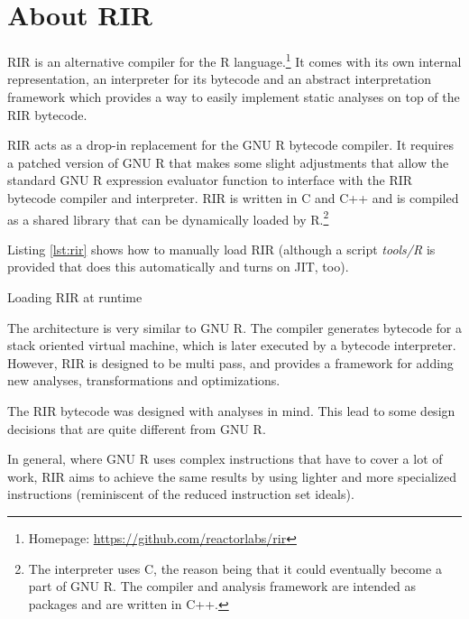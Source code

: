 \chapter{About RIR\label{rir}}

RIR is an alternative compiler for the R language.\footnote{Homepage: \url{https://github.com/reactorlabs/rir}} It comes with its own internal representation, an interpreter for its bytecode and an abstract interpretation framework which provides a way to easily implement static analyses on top of the RIR bytecode.

RIR acts as a drop-in replacement for the GNU R bytecode compiler. It requires a patched version of GNU R that makes some slight adjustments that allow the standard GNU R expression evaluator function to interface with the RIR bytecode compiler and interpreter. RIR is written in C and C++ and is compiled as a shared library that can be dynamically loaded by R.\footnote{The interpreter uses C, the reason being that it could eventually become a part of GNU R. The compiler and analysis framework are intended as packages and are written in C++.}

Listing \ref{lst:rir} shows how to manually load RIR (although a script \emph{tools/R} is provided that does this automatically and turns on JIT, too).

\begin{listing}[htbp]
  \caption{\label{lst:rir}Loading RIR at runtime}
  \begin{rcode}
> dyn.load("~/rir/build/librir.so")  # path to the shared object
> source("~/rir/rir/R/rir.R")  # load the API for RIR compiler
> # RIR is now ready:
> f <- rir.compile(function() {})
> f
function() {}
<bytecode: 0x34b4510>
> rir.disassemble(f)
0x2f80538
   guard_fun_  { == 0x2077cd8
   push_  23 # NULL
   ret_ 
  \end{rcode}
\end{listing}

The architecture is very similar to GNU R. The compiler generates bytecode for a stack oriented virtual machine, which is later executed by a bytecode interpreter. However, RIR is designed to be multi pass, and provides a framework for adding new analyses, transformations and optimizations.

The RIR bytecode was designed with analyses in mind. This lead to some design decisions that are quite different from GNU R.

In general, where GNU R uses complex instructions that have to cover a lot of work, RIR aims to achieve the same results by using lighter and more specialized instructions (reminiscent of the reduced instruction set ideals).

